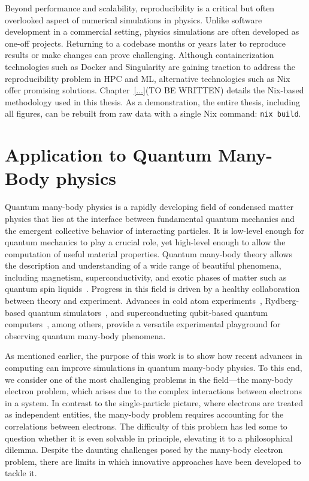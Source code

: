 Beyond performance and scalability, reproducibility is a critical but often overlooked aspect of numerical simulations in physics. Unlike software development in a commercial setting, physics simulations are often developed as one-off projects. Returning to a codebase months or years later to reproduce results or make changes can prove challenging. Although containerization technologies such as Docker and Singularity are gaining traction to address the reproducibility problem in HPC and ML, alternative technologies such as Nix~ offer promising solutions. Chapter~\ref{...}(TO BE WRITTEN) details the Nix-based methodology used in this thesis. As a demonstration, the entire thesis, including all figures, can be rebuilt from raw data with a single Nix command: \texttt{nix build}.

\section{Application to Quantum Many-Body physics}

Quantum many-body physics is a rapidly developing field of condensed matter physics that lies at the interface between fundamental quantum mechanics and the emergent collective behavior of interacting particles. It is low-level enough for quantum mechanics to play a crucial role, yet high-level enough to allow the computation of useful material properties. Quantum many-body theory allows the description and understanding of a wide range of beautiful phenomena, including magnetism, superconductivity, and exotic phases of matter such as quantum spin liquids~\cite{Zhou_2017_Quantum_spin_li}. Progress in this field is driven by a healthy collaboration between theory and experiment. Advances in cold atom experiments~\cite{Gross_2017_Quantum_simulat}, Rydberg-based quantum simulators~\cite{Browae_2020_Many_body_physi}, and superconducting qubit-based quantum computers~\cite{Anders_2025_Thermalization}, among others, provide a versatile experimental playground for observing quantum many-body phenomena.

As mentioned earlier, the purpose of this work is to show how recent advances in computing can improve simulations in quantum many-body physics. To this end, we consider one of the most challenging problems in the field---the many-body electron problem, which arises due to the complex interactions between electrons in a system. In contrast to the single-particle picture, where electrons are treated as independent entities, the many-body problem requires accounting for the correlations between electrons. The difficulty of this problem has led some to question whether it is even solvable in principle, elevating it to a philosophical dilemma. Despite the daunting challenges posed by the many-body electron problem, there are limits in which innovative approaches have been developed to tackle it.

